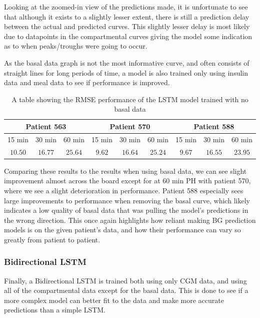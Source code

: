     Looking at the zoomed-in view of the predictions made, it is unfortunate to see that although it exists to a slightly lesser extent, there is still a prediction delay between the actual and predicted curves. This slightly lesser delay is most likely due to datapoints in the compartmental curves giving the model some indication as to when peaks/troughs were going to occur.

    As the basal data graph is not the most informative curve, and often consists of straight lines for long periods of time, a model is also trained only using insulin data and meal data to see if performance is improved.

    \begin{table}[H]
      \centering
      \caption{A table showing the RMSE performance of the LSTM model trained with no basal data}
      \begin{tabular}{|*{9}{c|}} 
        \hline
        \multicolumn{3}{|c}{Patient 563} & \multicolumn{3}{|c}{Patient 570} & \multicolumn{3}{|c|}{Patient 588} \\ \hline 
        15 min & 30 min & 60 min &15 min & 30 min & 60 min &15 min & 30 min & 60 min \\ \hline
        $10.50$&$16.77$ &$25.64$ &$9.62$&$16.64$ &$25.24$ &$9.67$ &$16.55$ &$23.95$ \\ \hline
      \end{tabular}
    \end{table}

    Comparing these results to the results when using basal data, we can see slight improvement almost across the board except for at 60 min PH with patient 570, where we see a slight deterioration in performance. Patient 588 especially sees large improvements to performance when removing the basal curve, which likely indicates a low quality of basal data that was pulling the model's predictions in the wrong direction. This once again highlights how reliant making BG prediction models is on the given patient's data, and how their performance can vary so greatly from patient to patient.

    \subsubsection{Bidirectional LSTM}

    Finally, a Bidirectional LSTM is trained both using only CGM data, and using all of the compartmental data except for the basal data. This is done to see if a more complex model can better fit to the data and make more accurate predictions than a simple LSTM.

